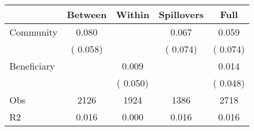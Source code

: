 
\begin{tabular}{l*{4}{c}}\hline&\multicolumn{1}{c}{Between}&\multicolumn{1}{c}{Within}&\multicolumn{1}{c}{Spillovers}&\multicolumn{1}{c}{Full}\\ \hline
 Community             &              0.080      &                                               &        0.067 &         0.059                            \\ 
                               &        (       0.058)           &                                       &       (       0.074)     &      (       0.074)                                           \\ 
 Beneficiary   &                                               &        0.009    &                                &             0.014                            \\ 
                               &                                               & (       0.050)                  &                                        &      (       0.048)                                           \\ 
\hline                                                                                                                                                                                                                                            
 Obs                   &               2126               &       1924                       &       1386                &              2718                                               \\ 
 R2                    &                      0.016              &              0.000                      &              0.016               &                     0.016                                              \\ 
\hline \end{tabular}                                                                                                                                                                                                              